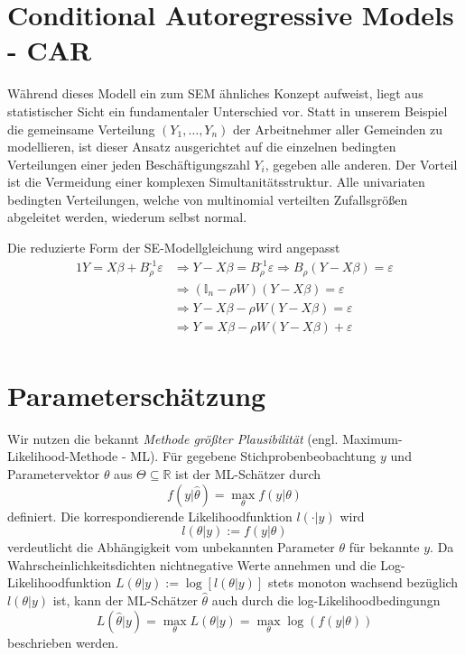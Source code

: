 \section{Conditional Autoregressive Models - CAR}

Während dieses Modell ein zum SEM ähnliches Konzept aufweist, liegt aus statistischer 
Sicht ein fundamentaler Unterschied vor. Statt in unserem Beispiel die gemeinsame 
Verteilung $(Y_{1},\ldots,Y_{n})$ der Arbeitnehmer aller Gemeinden zu modellieren, ist 
dieser Ansatz ausgerichtet auf die einzelnen bedingten Verteilungen einer jeden 
Beschäftigungszahl $Y_{i}$, gegeben alle anderen. Der Vorteil ist die Vermeidung einer 
komplexen Simultanitätsstruktur. Alle univariaten bedingten Verteilungen, welche von 
multinomial verteilten Zufallsgrößen abgeleitet werden, wiederum selbst normal.


Die reduzierte Form der SE-Modellgleichung wird angepasst
\begin{alignat*}{1}
    Y=X \beta + B_{\rho}^{\text{-1}} \varepsilon & \Rightarrow Y - X \beta = B_{\rho}^{\text{-1}} \varepsilon 
    \Rightarrow B_{\rho} (Y-X \beta) = \varepsilon \\
    & \Rightarrow  (\mathds{I}_{n} - \rho W)(Y-X \beta) = \varepsilon \\
    & \Rightarrow  Y - X \beta - \rho W (Y-X \beta) = \varepsilon \\
    & \Rightarrow  Y = X \beta - \rho W (Y-X \beta) + \varepsilon \\
\end{alignat*}


\section{Parameterschätzung}
Wir nutzen die bekannt \emph{Methode größter Plausibilität} (engl. Maximum-Likelihood-Methode - ML).
Für gegebene Stichprobenbeobachtung $y$ und Parametervektor $\theta$ aus $ \Theta \subseteq \mathds{R}$ ist 
der ML-Schätzer durch
\begin{equation*}
    f(y|\hat{\theta})=\max_{\theta} f(y|\theta)
\end{equation*}
definiert. Die korrespondierende Likelihoodfunktion $l(\cdot|y)$ wird 
\begin{equation*}
    l(\theta|y) := f(y|\theta)
\end{equation*}
verdeutlicht die Abhängigkeit vom unbekannten Parameter $\theta$ für bekannte $y$.
Da Wahrscheinlichkeitsdichten nichtnegative Werte annehmen und die Log-Likelihoodfunktion 
$L(\theta|y) := \operatorname{log} \left[ l(\theta|y) \right]$ stets monoton wachsend bezüglich $l(\theta|y)$ 
ist, kann der ML-Schätzer $\hat{\theta}$ auch durch die log-Likelihoodbedingungn
\begin{equation*}
    L(\hat{\theta}|y)=\max_{\theta} L(\theta|y) =\max_{\theta} \operatorname{log} (f(y|\theta))
\end{equation*}
beschrieben werden.

